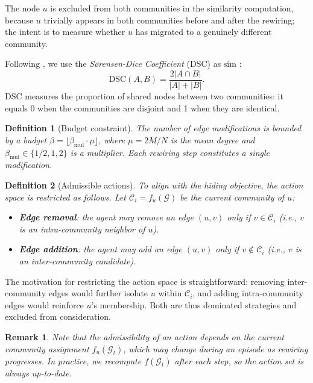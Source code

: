\documentclass[11pt,a4paper,twoside]{tesis}
\newtheorem{definition}{Definition}[chapter]
\newtheorem{remark}{Remark}[chapter]
\newcommand{\G}{\mathcal{G}}
\newcommand{\C}{\mathcal{C}}
\newcommand{\simf}{\mathrm{sim}}
\begin{document}
The node $u$ is excluded from both communities in the similarity computation, because
$u$ trivially appears in both communities before and after the rewiring; the intent is to
measure whether $u$ has migrated to a genuinely different community.

Following \textcite{bernini-2024}, we use the \emph{S{\o}rensen-Dice Coefficient} (DSC)
as $\simf$ \cite{sorensen1948dice}:
\[
\mathrm{DSC}(A, B) = \frac{2|A \cap B|}{|A| + |B|}.
\]
DSC measures the proportion of shared nodes between two communities: it equals 0 when
the communities are disjoint and 1 when they are identical.

\begin{definition}[Budget constraint]
\label{def:budget}
The number of edge modifications is bounded by a \emph{budget}
$\beta = \lfloor \beta_{\mathrm{mul}} \cdot \mu \rfloor$, where $\mu = 2M/N$ is the
mean degree and $\beta_{\mathrm{mul}} \in \{1/2, 1, 2\}$ is a multiplier. Each
rewiring step constitutes a single modification.
\end{definition}

\begin{definition}[Admissible actions]
\label{def:actions}
To align with the hiding objective, the action space is restricted as follows. Let
$\C_i = f_u(\G)$ be the current community of $u$:
\begin{itemize}
    \item \textbf{Edge removal}: the agent may remove an edge $(u, v)$ only if
      $v \in \C_i$ (i.e., $v$ is an \emph{intra-community} neighbor of $u$).
    \item \textbf{Edge addition}: the agent may add an edge $(u, v)$ only if
      $v \notin \C_i$ (i.e., $v$ is an \emph{inter-community} candidate).
\end{itemize}
\end{definition}

The motivation for restricting the action space is straightforward: removing
inter-community edges would further isolate $u$ within $\C_i$, and adding
intra-community edges would reinforce $u$'s membership. Both are thus dominated
strategies and excluded from consideration.

\begin{remark}
Note that the admissibility of an action depends on the \emph{current} community
assignment $f_u(\G_t)$, which may change during an episode as rewiring progresses.
In practice, we recompute $f(\G_t)$ after each step, so the action set is always
up-to-date.
\end{remark}
\end{document}
